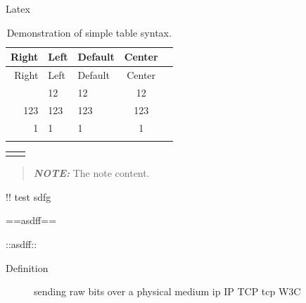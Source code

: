 \begin{frame}[fragile]{Latex}
\begin{longtable}[]{@{}rllcl@{}}
\caption{Demonstration of simple table syntax.}\tabularnewline
\toprule\noalign{}
Right & Left & Default & Center & \\
\midrule\noalign{}
\endfirsthead
\toprule\noalign{}
Right & Left & Default & Center & \\
\midrule\noalign{}
\endhead
12 & 12 & 12 & 12 & \\
123 & 123 & 123 & 123 & \\
1 & 1 & 1 & 1 & \\
\bottomrule\noalign{}
\end{longtable}

\begin{longtable}[]{@{}ll@{}}
\toprule\noalign{}
\endhead
& \\
\bottomrule\noalign{}
\end{longtable}

\begin{quote}
\textbf{\emph{NOTE:}} The note content.
\end{quote}

!! test sdfg

==asdff==

::asdff::

\begin{Shaded}
\begin{Highlighting}[]
\end{Highlighting}
\end{Shaded}

\begin{description}
\item[Definition]
sending raw bits over a physical medium ip IP TCP tcp W3C
\end{description}
\end{frame}

